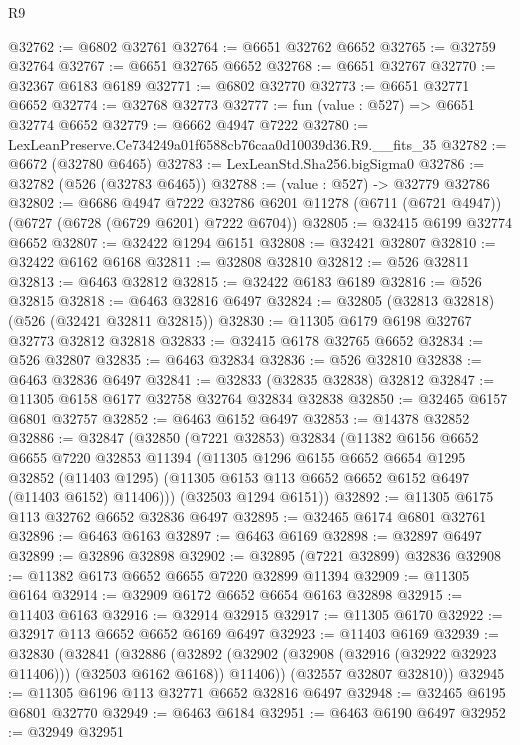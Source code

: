 \begin{lexlean}{R9}
\begin{coremodule}
@32762 := @6802 @32761
@32764 := @6651 @32762 @6652
@32765 := @32759 @32764
@32767 := @6651 @32765 @6652
@32768 := @6651 @32767
@32770 := @32367 @6183 @6189
@32771 := @6802 @32770
@32773 := @6651 @32771 @6652
@32774 := @32768 @32773
@32777 := fun (value : @527) => @6651 @32774 @6652
@32779 := @6662 @4947 @7222
@32780 := LexLeanPreserve.Ce734249a01f6588cb76caa0d10039d36.R9.__fits_35
@32782 := @6672 (@32780 @6465)
@32783 := LexLeanStd.Sha256.bigSigma0
@32786 := @32782 (@526 (@32783 @6465))
@32788 := (value : @527) -> @32779 @32786
@32802 := @6686
    @4947
    @7222
    @32786
    @6201
    @11278
    (@6711 (@6721 @4947))
    (@6727 (@6728 (@6729 @6201) @7222 @6704))
@32805 := @32415 @6199 @32774 @6652
@32807 := @32422 @1294 @6151
@32808 := @32421 @32807
@32810 := @32422 @6162 @6168
@32811 := @32808 @32810
@32812 := @526 @32811
@32813 := @6463 @32812
@32815 := @32422 @6183 @6189
@32816 := @526 @32815
@32818 := @6463 @32816 @6497
@32824 := @32805 (@32813 @32818) (@526 (@32421 @32811 @32815))
@32830 := @11305 @6179 @6198 @32767 @32773 @32812 @32818
@32833 := @32415 @6178 @32765 @6652
@32834 := @526 @32807
@32835 := @6463 @32834
@32836 := @526 @32810
@32838 := @6463 @32836 @6497
@32841 := @32833 (@32835 @32838) @32812
@32847 := @11305 @6158 @6177 @32758 @32764 @32834 @32838
@32850 := @32465 @6157 @6801 @32757
@32852 := @6463 @6152 @6497
@32853 := @14378 @32852
@32886 := @32847
    (@32850
      (@7221 @32853)
      @32834
      (@11382
        @6156
        @6652
        @6655
        @7220
        @32853
        @11394
        (@11305
          @1296
          @6155
          @6652
          @6654
          @1295
          @32852
          (@11403 @1295)
          (@11305 @6153 @113 @6652 @6652 @6152 @6497 (@11403 @6152) @11406)))
      (@32503 @1294 @6151))
@32892 := @11305 @6175 @113 @32762 @6652 @32836 @6497
@32895 := @32465 @6174 @6801 @32761
@32896 := @6463 @6163
@32897 := @6463 @6169
@32898 := @32897 @6497
@32899 := @32896 @32898
@32902 := @32895 (@7221 @32899) @32836
@32908 := @11382 @6173 @6652 @6655 @7220 @32899 @11394
@32909 := @11305 @6164
@32914 := @32909 @6172 @6652 @6654 @6163 @32898
@32915 := @11403 @6163
@32916 := @32914 @32915
@32917 := @11305 @6170
@32922 := @32917 @113 @6652 @6652 @6169 @6497
@32923 := @11403 @6169
@32939 := @32830
    (@32841
      (@32886
        (@32892 (@32902 (@32908 (@32916 (@32922 @32923 @11406))) (@32503 @6162 @6168)) @11406))
      (@32557 @32807 @32810))
@32945 := @11305 @6196 @113 @32771 @6652 @32816 @6497
@32948 := @32465 @6195 @6801 @32770
@32949 := @6463 @6184
@32951 := @6463 @6190 @6497
@32952 := @32949 @32951

\end{coremodule}
\end{lexlean}
